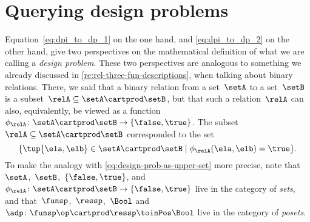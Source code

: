 
\section{Querying design problems}
\label{sec:dp-querying}



Equation~\cref{eq:dpi_to_dp_1} on the one hand, and \cref{eq:dpi_to_dp_2} on the other hand, give two perspectives on the mathematical definition of what we are calling a \emph{design problem}.
These two perspectives are analogous to something we already discussed in \cref{re:rel-three-fun-descriptions}, when talking about binary relations.
There, we said that a binary relation from a set~$\setA$ to a set~$\setB$ is a subset~$\relA \subseteq \setA \cartprod \setB$,
but that such a relation~$\relA$ can also, equivalently, be viewed as a function~$\phi_{\relA}\colon \setA \cartprod\setB \to \{ \false, \true \}$.
The subset~$\relA \subseteq \setA \cartprod \setB$ corresponded to the set
\begin{equation}
    \{ \tup{\ela, \elb} \in \setA \cartprod \setB \mid \phi_{\relA}(\ela, \elb) = \true \}.
\end{equation}
%
To make the analogy with \cref{eq:design-prob-as-upper-set} more precise, note that~$\setA$,~$\setB$,~$\{ \false, \true \}$, and~$\phi_{\relA}\colon \setA \cartprod\setB \to \{ \false, \true \}$ live in the category of \emph{sets}, and that~$\funsp$,~$\ressp$,~$\Bool$ and~$\adp\colon \funsp\op \cartprod \ressp\toinPos \Bool$ live in the category of \emph{posets}.

